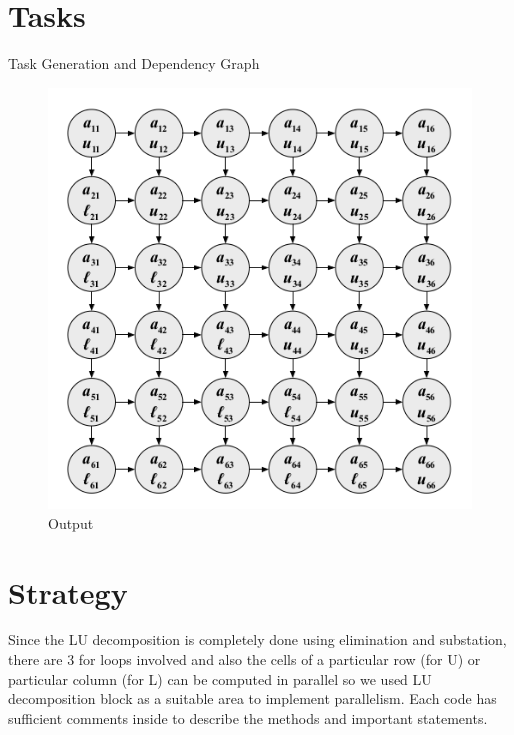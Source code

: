 \documentclass{beamer}
\begin{document}
\section{Tasks}
\begin{frame}{Task Generation and Dependency Graph}
\begin{figure}[htp]
\centering
\includegraphics[scale=.4]{pic2.png}
\caption{Output}
\end{figure}
\end{frame}

\section{Strategy}
\begin{frame}
Since the LU decomposition is completely done using elimination and substation, there are 3 for loops 
involved and also the cells of a particular row (for U) or particular column (for L) can be computed in 
parallel so we used LU decomposition block as a suitable area to implement parallelism. Each code has sufficient comments inside to describe the methods and important statements. 
\end{frame}
\end{document}
